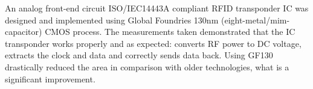 An analog front-end circuit ISO/IEC14443A compliant RFID transponder IC was designed and implemented using Global Foundries 130nm (eight-metal/mim-capacitor) CMOS process. The measurements taken demonstrated that the IC transponder works properly and as expected: converts RF power to DC voltage, extracts the clock and data and correctly sends data back. Using GF130 drastically reduced the area in comparison with older technologies, what is a significant improvement.
